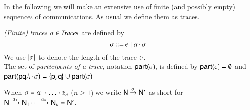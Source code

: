 \bigskip

In the following we will make an extensive use of finite (and possibly
empty) sequences of communications. As usual we define them as traces.
\begin{definition}[Traces]\label{traces} {\em (Finite) traces} $\sigma \in
  \textit{Traces}$ are defined by:
 \[
  \sigma::=\epsilon\mid\alpha\,{\cdot}\,\sigma
 \]
 We use
  $\!\!~|~\! \sigma\!~|~\!$ to denote the length of the trace $\sigma$.\\ 
  The set of {\em participants of a trace}, notation ${\sf part}(\sigma)$, 
  is defined by 
  ${\sf part}(\epsilon)=\emptyset$ and
  ${\sf part}({\sf p}{\sf q}\lambda\,{\cdot}\,\sigma)=\{{\sf p},{\sf q}\}\cup{\sf part}(\sigma)$.
\end{definition}
\noindent 
When
$\sigma=\alpha_1\,{\cdot}\,\ldots\,{\cdot}\,\alpha_n$ ($n\geq 1)$ we
write ${\sf N}\xrightarrow{\sigma}{\sf N}'$ as short for
${\sf N}\xrightarrow{\alpha_1}{\sf N}_1\cdots\xrightarrow{\alpha_n}{\sf N}_n = {\sf N}'$.


